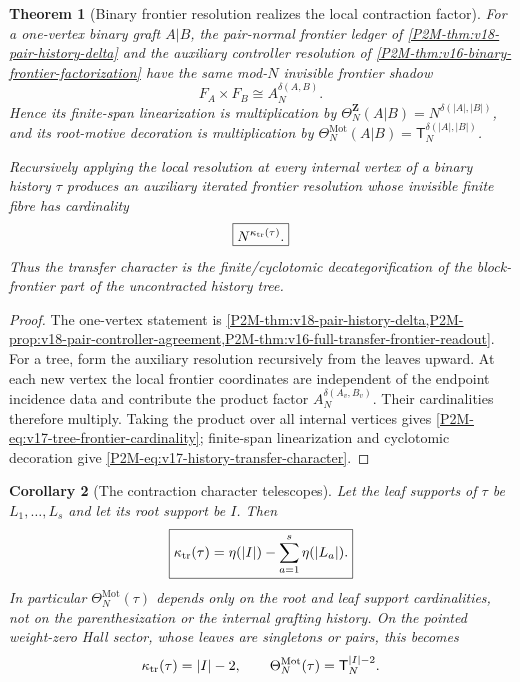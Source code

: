\documentclass[11pt]{article}
\newtheorem{theorem}{Theorem}[section]
\newtheorem{corollary}[theorem]{Corollary}
\theoremstyle{remark}
\newcommand{\Z}{\mathbf Z}
\newcommand{\Mot}{\mathrm{Mot}}
\begin{document}
\begin{theorem}[Binary frontier resolution realizes the local contraction factor]
\label{P2M-thm:v17-local-history-contraction-factor}
For a one-vertex binary graft $A|B$, the pair-normal frontier ledger of
\cref{P2M-thm:v18-pair-history-delta} and the auxiliary controller resolution of
\cref{P2M-thm:v16-binary-frontier-factorization} have the same mod-$N$ invisible frontier shadow
\[
 F_A\times F_B\cong A_N^{\delta(A,B)}.
\]
Hence its finite-span linearization is multiplication by
$\Theta_N^{\Z}(A|B)=N^{\delta(|A|,|B|)}$, and its root-motive decoration is
multiplication by
$\Theta_N^{\Mot}(A|B)=\mathsf T_N^{\delta(|A|,|B|)}$.

Recursively applying the local resolution at every internal vertex of a
binary history $\tau$ produces an auxiliary iterated frontier resolution whose
invisible finite fibre has cardinality
\begin{equation}\label{P2M-eq:v17-tree-frontier-cardinality}
 \boxed{N^{\kappa_{\rm tr}(\tau)}.}
\end{equation}
Thus the transfer character is the finite/cyclotomic decategorification of the
block-frontier part of the uncontracted history tree.
\end{theorem}

\begin{proof}
The one-vertex statement is
\cref{P2M-thm:v18-pair-history-delta,P2M-prop:v18-pair-controller-agreement,P2M-thm:v16-full-transfer-frontier-readout}.
For a tree, form the auxiliary resolution recursively from the leaves upward.
At each new vertex the local frontier coordinates are independent of the
endpoint incidence data and contribute the product factor
$A_N^{\delta(A_v,B_v)}$.  Their cardinalities therefore multiply.  Taking the
product over all internal vertices gives \eqref{P2M-eq:v17-tree-frontier-cardinality};
finite-span linearization and cyclotomic decoration give
\eqref{P2M-eq:v17-history-transfer-character}.
\end{proof}

\begin{corollary}[The contraction character telescopes]
\label{P2M-cor:v17-history-character-telescopes}
Let the leaf supports of $\tau$ be $L_1,\ldots,L_s$ and let its root support
be $I$.  Then
\begin{equation}
 \boxed{
 \kappa_{\rm tr}(\tau)
 =\eta(|I|)-\sum_{a=1}^s\eta(|L_a|).}
\end{equation}
In particular $\Theta_N^{\Mot}(\tau)$ depends only on the root and leaf
support cardinalities, not on the parenthesization or the internal grafting
history.  On the pointed weight-zero Hall sector, whose leaves are singletons
or pairs, this becomes
\[
 \kappa_{\rm tr}(\tau)=|I|-2,
 \qquad
 \Theta_N^{\Mot}(\tau)=\mathsf T_N^{|I|-2}.
\]
\end{corollary}
\end{document}
